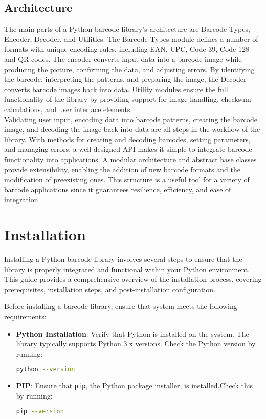 \subsection{Architecture}

The main parts of a Python barcode library's architecture are Barcode Types, Encoder, Decoder, and Utilities. The Barcode Types module defines a number of formats with unique encoding rules, including EAN, UPC, Code 39, Code 128 and QR codes. The encoder converts input data into a barcode image while producing the picture, confirming the data, and adjusting errors. By identifying the barcode, interpreting the patterns, and preparing the image, the Decoder converts barcode images back into data. Utility modules ensure the full functionality of the library by providing support for image handling, checksum calculations, and user interface elements.\\

Validating user input, encoding data into barcode patterns, creating the barcode image, and decoding the image back into data are all steps in the workflow of the library. With methods for creating and decoding barcodes, setting parameters, and managing errors, a well-designed API makes it simple to integrate barcode functionality into applications. A modular architecture and abstract base classes provide extensibility, enabling the addition of new barcode formats and the modification of preexisting ones. This structure is a useful tool for a variety of barcode applications since it guarantees resilience, efficiency, and ease of integration.\cite{Eicebluebarcodepython:2024}\\

\section{Installation}


Installing a Python barcode library involves several steps to ensure that the library is properly integrated and functional within your Python environment. This guide provides a comprehensive overview of the installation process, covering prerequisites, installation steps, and post-installation configuration.

Before installing a barcode library, ensure that system meets the following requirements:

\begin{itemize}
	\item \textbf{Python Installation}: Verify that Python is installed on the system. The library typically supports Python 3.x versions. Check the Python version by running:
	\begin{lstlisting}[language=bash]
		python --version
	\end{lstlisting}
	\item \textbf{PIP}: Ensure that \texttt{pip}, the Python package installer, is installed.Check this by running:
	\begin{lstlisting}[language=bash]
		pip --version
	\end{lstlisting}
\end{itemize}


